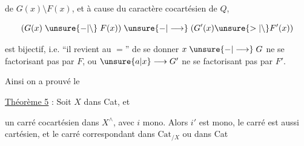 
de $G(x)\setminus F(x)$, et à cause du caractère cocartésien de $Q$,

\[
(G(x)\mathrel{\unsure{-|\setminus}}F(x))\mathrel{\unsure{-|\longrightarrow}}(G'(x)\unsure{>|\setminus}F'(x))
\]

est bijectif, i.e. ``il revient au $=$'' de se donner $x\mathrel{\unsure{-|\longrightarrow}}G$ ne se factorisant pas par $F$, ou $\unsure{a|x}\longrightarrow G'$ ne se factorisant pas par $F'$.

Ainsi on a prouvé le

\uline{Théorème 5} : Soit $X$ dans Cat, et


un carré cocartésien dans $X^\wedge$, avec $i$ mono. Alors $i'$ est mono, le carré  est aussi cartésien, et le carré correspondant dans $\mathrm{Cat}_{/X}$ ou dans Cat

